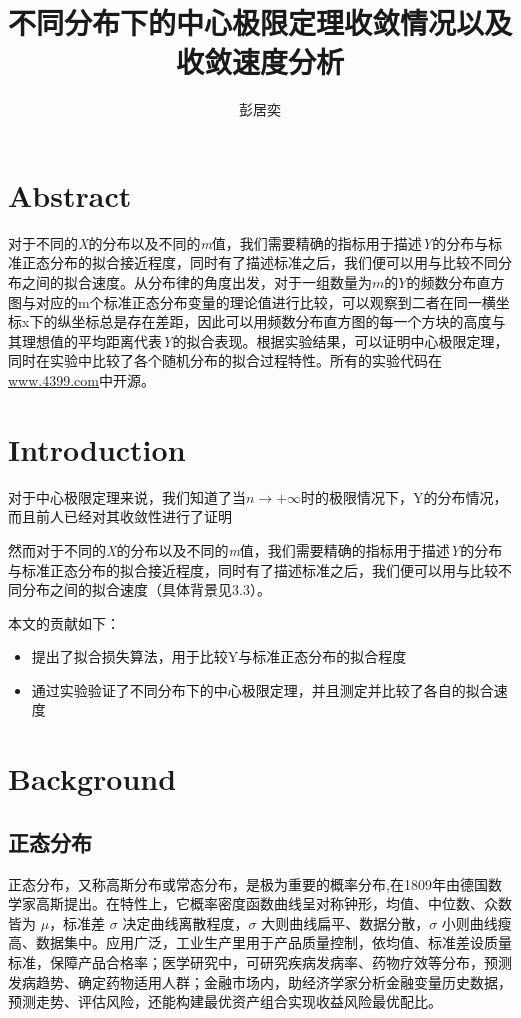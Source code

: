 \documentclass{article}
\title{不同分布下的中心极限定理收敛情况以及收敛速度分析}
\author{彭居奕}
\begin{document}
\maketitle
\section{Abstract}
对于不同的\textit{X}的分布以及不同的\textit{m}值，我们需要精确的指标用于描述\textit{Y}的分布与标准正态分布的拟合接近程度，同时有了描述标准之后，我们便可以用与比较不同分布之间的拟合速度。从分布律的角度出发，对于一组数量为$m$的$Y$的频数分布直方图与对应的m个标准正态分布变量的理论值进行比较，可以观察到二者在同一横坐标x下的纵坐标总是存在差距，因此可以用频数分布直方图的每一个方块的高度与其理想值的平均距离代表\textit{Y}的拟合表现。根据实验结果，可以证明中心极限定理，同时在实验中比较了各个随机分布的拟合过程特性。所有的实验代码在\url{www.4399.com}中开源。
\section{Introduction}

对于中心极限定理\cite{laplace}来说，我们知道了当$n\to+\infty$时的极限情况下，Y的分布情况，而且前人已经对其收敛性进行了证明\cite{Liapounov1901}

然而对于不同的\textit{X}的分布以及不同的\textit{m}值，我们需要精确的指标用于描述\textit{Y}的分布与标准正态分布的拟合接近程度，同时有了描述标准之后，我们便可以用与比较不同分布之间的拟合速度（具体背景见3.3）。

本文的贡献如下：
\begin{itemize}
\item 提出了拟合损失算法，用于比较Y与标准正态分布的拟合程度
\item 通过实验验证了不同分布下的中心极限定理，并且测定并比较了各自的拟合速度
\end{itemize}



\section{Background}

\subsection{正态分布}
正态分布\cite{gauss}，又称高斯分布或常态分布，是极为重要的概率分布,在1809年由德国数学家高斯提出。在特性上，它概率密度函数曲线呈对称钟形，均值、中位数、众数皆为 $\mu$，标准差 $\sigma$ 决定曲线离散程度，$\sigma$ 大则曲线扁平、数据分散，$\sigma$ 小则曲线瘦高、数据集中。应用广泛，工业生产里用于产品质量控制，依均值、标准差设质量标准，保障产品合格率；医学研究中，可研究疾病发病率、药物疗效等分布，预测发病趋势、确定药物适用人群；金融市场内，助经济学家分析金融变量历史数据，预测走势、评估风险，还能构建最优资产组合实现收益风险最优配比。
\end{document}
